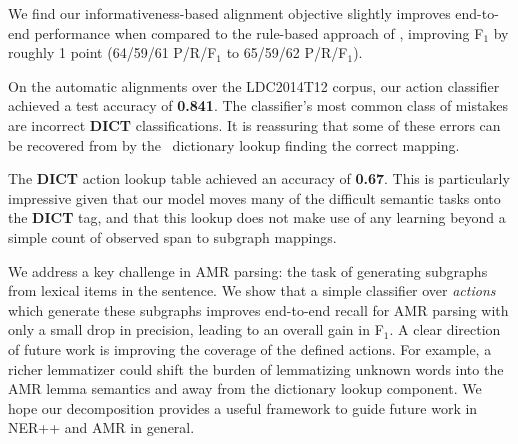\documentclass[11pt]{article}
\begin{document}
We find our informativeness-based alignment objective slightly improves end-to-end performance
  when compared to the rule-based approach of \cite{2014flanigan-amr}, 
  improving F$_1$ by roughly 1 point (64/59/61 P/R/F$_1$ to 65/59/62 P/R/F$_1$).



On the automatic alignments over the LDC2014T12 corpus,
  our action classifier achieved a test accuracy of \textbf{0.841}.
The classifier's most common class of mistakes are incorrect \textbf{DICT} classifications. 
It is reassuring that some of these errors can be recovered from by the 
  \naive\ dictionary lookup finding the correct mapping.

The \textbf{DICT} action lookup table achieved an accuracy of \textbf{0.67}.
This is particularly impressive given that our model moves many of the difficult 
  semantic tasks onto the \textbf{DICT} tag, and that this lookup does not make
  use of any learning beyond a simple count of observed span to subgraph mappings.


We address a key challenge in AMR parsing: 
  the task of generating subgraphs from lexical items in the sentence.
We show that a 
  simple classifier over \textit{actions} which generate
  these subgraphs improves end-to-end recall for AMR parsing with only a small
  drop in precision, leading to an overall gain in F$_1$.
A clear direction of future work is improving the coverage of the defined actions.
For example, a richer lemmatizer could shift the burden of lemmatizing unknown
  words into the AMR lemma semantics and away from the dictionary lookup component.
We hope our decomposition provides a useful framework to guide future work in NER++ and AMR in general.
  
\end{document}
